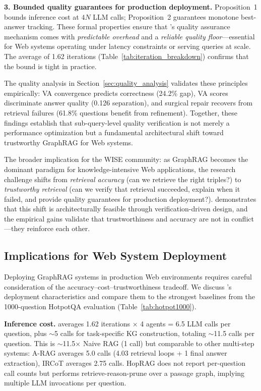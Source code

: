 \smallskip
\noindent\textbf{3. Bounded quality guarantees for production deployment.}
Proposition~1 bounds inference cost at $4N$ LLM calls; Proposition~2 guarantees
monotone best-answer tracking. These formal properties ensure that \sys's quality
assurance mechanism comes with \emph{predictable overhead} and a \emph{reliable
quality floor}---essential for Web systems operating under latency constraints
or serving queries at scale. The average of 1.62 iterations (Table~\ref{tab:iteration_breakdown})
confirms that the bound is tight in practice.

The quality analysis in Section~\ref{sec:quality_analysis} validates these
principles empirically: VA convergence predicts correctness (24.2\% gap), VA
scores discriminate answer quality (0.126 separation), and surgical repair
recovers from retrieval failures (61.8\% questions benefit from refinement).
Together, these findings establish that sub-query-level quality verification
is not merely a performance optimization but a fundamental architectural shift
toward trustworthy GraphRAG for Web systems.

The broader implication for the WISE community: as GraphRAG becomes the dominant
paradigm for knowledge-intensive Web applications, the research challenge shifts
from \emph{retrieval accuracy} (can we retrieve the right triples?) to
\emph{trustworthy retrieval} (can we verify that retrieval succeeded, explain
when it failed, and provide quality guarantees for production deployment?). \sys
demonstrates that this shift is architecturally feasible through verification-driven
design, and the empirical gains validate that trustworthiness and accuracy are
not in conflict---they reinforce each other.

\subsection{Implications for Web System Deployment}

Deploying GraphRAG systems in production Web environments requires careful
consideration of the accuracy--cost--trustworthiness tradeoff. We discuss \sys's
deployment characteristics and compare them to the strongest baselines from the
1000-question HotpotQA evaluation (Table~\ref{tab:hotpot1000}).

\smallskip
\noindent\textbf{Inference cost.}
\sys averages 1.62 iterations $\times$ 4 agents = 6.5 LLM calls per question,
plus $\sim$5 calls for task-specific KG construction, totaling $\sim$11.5 calls
per question. This is $\sim$11.5$\times$ Naive RAG (1 call) but comparable to
other multi-step systems: A-RAG averages 5.0 calls (4.03 retrieval loops + 1
final answer extraction), IRCoT averages 2.75 calls. HopRAG does not report
per-question call counts but performs retrieve-reason-prune over a passage graph,
implying multiple LLM invocations per question.

